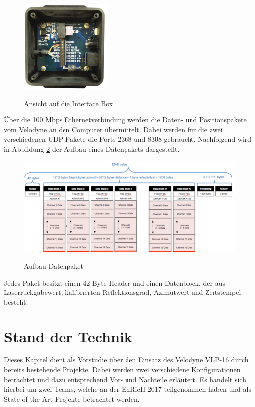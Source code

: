 \begin{figure}[H]
	\centering
	\includegraphics[width=0.4\textwidth]
	{resources/InterfaceBox.PNG}
	\caption[Ansicht auf die Interfacebox]{Ansicht auf die Interface Box} \protect\cite{velodyne}
	\label{fig:InterfaceBox}
\end{figure}

Über die 100 Mbps Ethernetverbindung werden die Daten- und Positionspakete vom Velodyne an den Computer übermittelt. Dabei werden für die zwei verschiedenen \ac{UDP} Pakete die Ports 2368 und 8308 gebraucht. Nachfolgend wird in Abbildung \ref{fig:datapakets} der Aufbau eines Datenpakets dargestellt.

\begin{figure}[H]
	\centering
	\includegraphics[width=1.0\textwidth]
	{resources/datapakets.PNG}
	\caption[Aufbau Datenpaket]{Aufbau Datenpaket} \protect\cite{velodyne}
	\label{fig:datapakets}
\end{figure}

 Jedes Paket besitzt einen 42-Byte Header und einen Datenblock, der aus Laserrückgabewert, kalibrierten Reflektionsgrad, Azimutwert und Zeitstempel besteht. 

\section{Stand der Technik}
 \label{sec:Vorzeigeprojekte}
 Dieses Kapitel dient als Vorstudie über den Einsatz des Velodyne VLP-16 durch bereits bestehende Projekte. Dabei werden zwei verschiedene Konfigurationen betrachtet und dazu entsprechend Vor- und Nachteile erläutert. Es handelt sich hierbei um zwei Teams, welche an der \ac{EnRicH} 2017 teilgenommen haben und als State-of-the-Art Projekte betrachtet werden.
 
